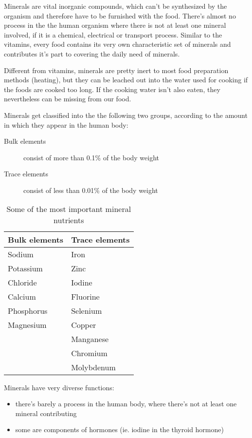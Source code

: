 \documentclass[../main.tex]{subfiles}
\begin{document}
\label{tab:minerals}
Minerals are vital inorganic compounds, which can't be synthesized by the organism
and therefore have to be furnished with the food.
There's almost no process in the the human organism where there is not at least one mineral involved,
if it is a chemical, electrical or transport process.
Similar to the vitamins, every food contains its very own characteristic set of minerals and contributes it's part
to covering the daily need of minerals.

Different from vitamins, minerals are pretty inert to most food preparation methods (heating), but they can be leached out into
the water used for cooking if the foods are cooked too long.
If the cooking water isn't also eaten, they nevertheless can be missing from our food.

\vspace{5mm}
\noindent Minerals get classified into the the following two groups, according to the amount in which they  appear in the human body:

\begin{description}
  \item[Bulk elements] consist of more than 0.1\% of the body weight
\item[Trace elements] consist of less than 0.01\% of the body weight
\end{description}

\begin{table}[htb!]
  \centering
  \begin{tabular}{ll}
    \textbf{Bulk elements} & \textbf{Trace elements} \\
    \hline
    Sodium & Iron \\
    Potassium & Zinc \\
    Chloride & Iodine \\
    Calcium & Fluorine \\
    Phosphorus & Selenium \\
    Magnesium & Copper \\
                           & Manganese \\
                           & Chromium \\
    & Molybdenum \\
  \end{tabular}
  \caption[Most important minerals]{Some of the most important mineral nutrients}
\end{table}

Minerals have very diverse functions:
\begin{itemize}
\item there's barely a process in the human body, where there's not at least one mineral contributing
  \item some are components of hormones (ie. iodine in the thyroid hormone)
\end{itemize}
\end{document}
